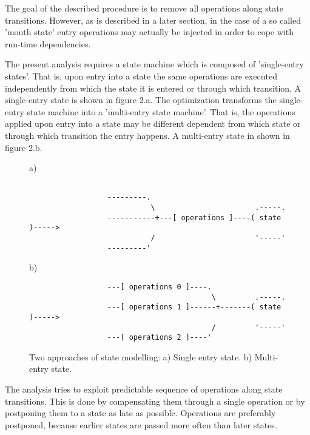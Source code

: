 \documentclass[12pt,a4paper]{scrartcl}
\theoremstyle{break}
\begin{document}
     
The goal of the described procedure is to remove all operations along state
transitions. However, as is described in a later section, in the case of a 
so called 'mouth state' entry operations may actually be injected in order
to cope with run-time dependencies.

The present analysis requires a state machine which is composed of
'single-entry states'. That is, upon entry into a state the same operations are
executed independently from which the state it is entered or through which
transition.  A single-entry state is shown in figure 2.a. The optimization
transforms the single-entry state machine into a 'multi-entry state machine'.
That is, the operations applied upon entry into a state may be different
dependent from which state or through which transition the entry happens.  A
multi-entry state in shown in figure 2.b.

\begin{figure}[htbp] \leavevmode
a)

\begin{verbatim}
     
                  ---------.
                            \                       .-----.
                  -----------+---[ operations ]----( state )----->   
                            /                       '-----'
                  ---------'       
\end{verbatim}
     
b)
     
\begin{verbatim}
                  ---[ operations 0 ]----.
                                          \         .-----.
                  ---[ operations 1 ]------+-------( state )----->  
                                          /         '-----'
                  ---[ operations 2 ]----'       

\end{verbatim}
\caption{Two approaches of state modelling: a) Single entry state. 
b) Multi-entry state.}
\end{figure}

The analysis tries to exploit predictable sequence of operations along state
transitions. This is done by compensating them through a single operation or by
postponing them to a state as late as possible.  Operations are preferably
postponed, because earlier states are passed more often than later states.

%
\end{document}
